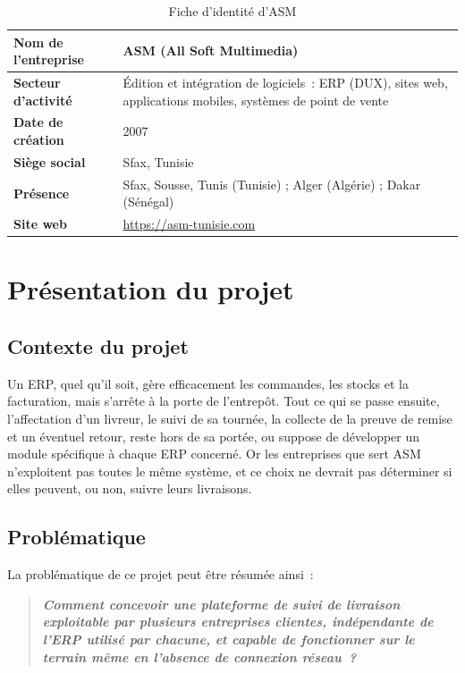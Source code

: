 \begin{table}[H]
\centering
\caption{Fiche d'identité d'ASM}
\begin{tabularx}{\textwidth}{L{4cm}X}
\hline
{}
\textbf{Nom de l'entreprise} & ASM (All Soft Multimedia) \\
\hline
\textbf{Secteur d'activité} & Édition et intégration de logiciels~: ERP (DUX), sites web,
applications mobiles, systèmes de point de vente \\
\hline
\textbf{Date de création} & 2007 \\
\hline
\textbf{Siège social} & Sfax, Tunisie \\
\hline
\textbf{Présence} & Sfax, Sousse, Tunis (Tunisie) ; Alger (Algérie) ; Dakar (Sénégal) \\
\hline
\textbf{Site web} & \url{https://asm-tunisie.com} \\
\hline
\end{tabularx}
\end{table}

\section{Présentation du projet}

\subsection{Contexte du projet}

Un ERP, quel qu'il soit, gère efficacement les commandes, les stocks et la facturation, mais
s'arrête à la porte de l'entrepôt. Tout ce qui se passe ensuite, l'affectation d'un livreur, le suivi
de sa tournée, la collecte de la preuve de remise et un éventuel retour, reste hors de sa portée, ou
suppose de développer un module spécifique à chaque ERP concerné. Or les entreprises que
sert ASM n'exploitent pas toutes le même système, et ce choix ne devrait pas
déterminer si elles peuvent, ou non, suivre leurs livraisons.

\subsection{Problématique}

La problématique de ce projet peut être résumée ainsi~:

\begin{quote}
\bfseries\itshape
Comment concevoir une plateforme de suivi de livraison exploitable par plusieurs entreprises
clientes, indépendante de l'ERP utilisé par chacune, et capable de fonctionner sur le terrain même
en l'absence de connexion réseau~?
\end{quote}

